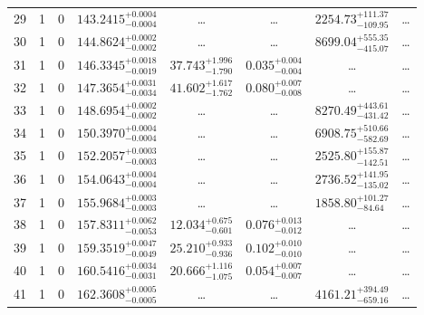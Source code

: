 \begin{table*}[!]
\begin{tabular}{llcrrlrc}
29 & 1 & 0 & $    143.2415_{-      0.0004}^{+      0.0004}$ & \multicolumn{1}{c}{\dots} & \multicolumn{1}{c}{\dots} & $     2254.73_{-      109.95}^{+      111.37}$ & \dots \\[1pt]
30 & 1 & 0 & $    144.8624_{-      0.0002}^{+      0.0002}$ & \multicolumn{1}{c}{\dots} & \multicolumn{1}{c}{\dots} & $     8699.04_{-      415.07}^{+      555.35}$ & \dots \\[1pt]
31 & 1 & 0 & $    146.3345_{-      0.0019}^{+      0.0018}$ & $      37.743_{-       1.790}^{+       1.996}$ & $       0.035_{-       0.004}^{+       0.004}$ & \multicolumn{1}{c}{\dots} & \dots\\[1pt]
32 & 1 & 0 & $    147.3654_{-      0.0034}^{+      0.0031}$ & $      41.602_{-       1.762}^{+       1.617}$ & $       0.080_{-       0.008}^{+       0.007}$ & \multicolumn{1}{c}{\dots} & \dots\\[1pt]
33 & 1 & 0 & $    148.6954_{-      0.0002}^{+      0.0002}$ & \multicolumn{1}{c}{\dots} & \multicolumn{1}{c}{\dots} & $     8270.49_{-      431.42}^{+      443.61}$ & \dots\\[1pt]
34 & 1 & 0 & $    150.3970_{-      0.0004}^{+      0.0004}$ & \multicolumn{1}{c}{\dots} & \multicolumn{1}{c}{\dots} & $     6908.75_{-      582.69}^{+      510.66}$ & \dots\\[1pt]
35 & 1 & 0 & $    152.2057_{-      0.0003}^{+      0.0003}$ & \multicolumn{1}{c}{\dots} & \multicolumn{1}{c}{\dots} & $     2525.80_{-      142.51}^{+      155.87}$ & \dots\\[1pt]
36 & 1 & 0 & $    154.0643_{-      0.0004}^{+      0.0004}$ & \multicolumn{1}{c}{\dots} & \multicolumn{1}{c}{\dots} & $     2736.52_{-      135.02}^{+      141.95}$ & \dots\\[1pt]

37 & 1 & 0 & $    155.9684_{-      0.0003}^{+      0.0003}$ & \multicolumn{1}{c}{\dots} & \multicolumn{1}{c}{\dots} & $     1858.80_{-       84.64}^{+      101.27}$ & \dots\\[1pt]
38 & 1 & 0 & $    157.8311_{-      0.0053}^{+      0.0062}$ & $      12.034_{-       0.601}^{+       0.675}$ & $       0.076_{-       0.012}^{+       0.013}$ & \multicolumn{1}{c}{\dots} & \dots\\[1pt]
39 & 1 & 0 & $    159.3519_{-      0.0049}^{+      0.0047}$ & $      25.210_{-       0.936}^{+       0.933}$ & $       0.102_{-       0.010}^{+       0.010}$ & \multicolumn{1}{c}{\dots} & \dots\\[1pt]
40 & 1 & 0 & $    160.5416_{-      0.0031}^{+      0.0034}$ & $      20.666_{-       1.075}^{+       1.116}$ & $       0.054_{-       0.007}^{+       0.007}$ & \multicolumn{1}{c}{\dots} & \dots\\[1pt]
41 & 1 & 0 & $    162.3608_{-      0.0005}^{+      0.0005}$ & \multicolumn{1}{c}{\dots} & \multicolumn{1}{c}{\dots} & $     4161.21_{-      659.16}^{+      394.49}$ & \dots\\[1pt]


\end{tabular}
\end{table*}
